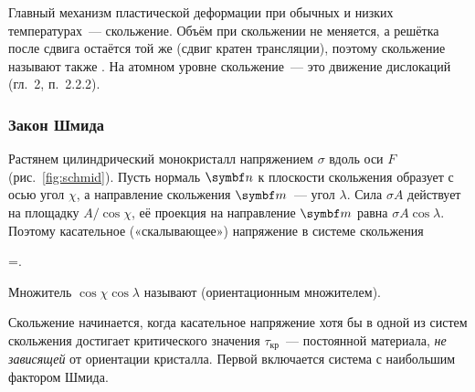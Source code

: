 Главный механизм пластической деформации при обычных и низких
температурах~— скольжение. Объём при скольжении не меняется, а решётка
после сдвига остаётся той же (сдвиг кратен трансляции), поэтому скольжение
называют также . На атомном уровне скольжение~— это
движение дислокаций (гл.~2, п.~2.2.2).

\subsubsection{Закон Шмида}

Растянем цилиндрический монокристалл напряжением $\sigma$ вдоль оси $F$
(рис.~\ref{fig:schmid}). Пусть нормаль $\vb n$ к плоскости скольжения
образует с осью угол $\chi$, а направление скольжения $\vb m$~— угол
$\lambda$. Сила $\sigma A$ действует на площадку $A/\cos\chi$, её проекция
на направление $\vb m$ равна $\sigma A\cos\lambda$. Поэтому касательное
(«скалывающее») напряжение в системе скольжения
\begin{keyeq}\label{eq:schmid}
\tau=\sigma\cos\chi\cos\lambda .
\end{keyeq}
Множитель $\cos\chi\cos\lambda$ называют 
(ориентационным множителем).

\begin{glavnoe}
Скольжение начинается, когда касательное напряжение хотя бы в одной из
систем скольжения достигает критического значения $\tau_\text{кр}$~—
постоянной материала, \emph{не зависящей} от ориентации кристалла.
Первой включается система с наибольшим фактором Шмида.
\end{glavnoe}

